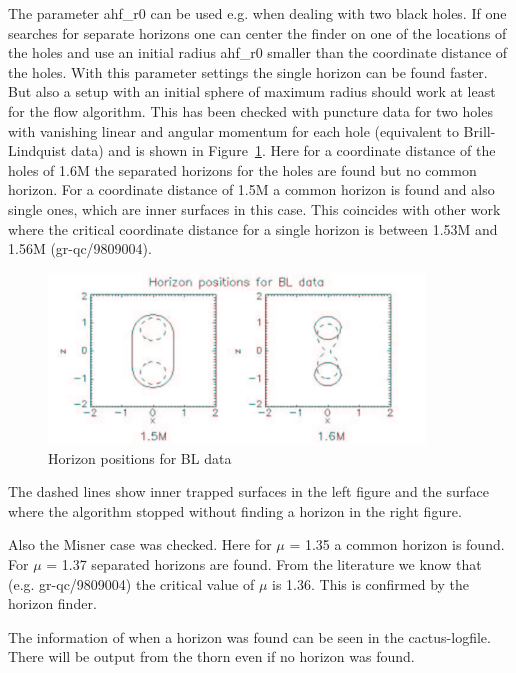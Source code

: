 The parameter ahf\_r0 can be used e.g. when dealing with two black holes.
If one searches for separate horizons one can center the finder on one of
the locations of the holes and use an initial radius ahf\_r0 smaller than
the coordinate distance of the holes. With this parameter settings the
single horizon can be found faster. But also a setup with an initial
sphere of maximum radius should work at least for the flow algorithm.
This has been checked with puncture data for two holes with vanishing
linear and angular momentum for each hole (equivalent to Brill-Lindquist
data) and is shown in Figure~\ref{CactusEinstein_AHFinder_p2_conv}. 
Here for a coordinate distance of the holes of 1.6M the separated
horizons for the holes are found but no common horizon. For a coordinate
distance of 1.5M a common horizon is found and also single ones, which
are inner surfaces in this case. This coincides with other work where the
critical coordinate distance for a single horizon is between 1.53M and
1.56M (gr-qc/9809004).

\begin{figure}[ht]
\begin{center}
\includegraphics[angle=0,width=10cm]{hori_bl}
\end{center}
\caption{Horizon positions for BL data}
\label{CactusEinstein_AHFinder_p2_conv}
\end{figure}

The dashed lines show inner trapped surfaces in the left figure and the
surface where the algorithm stopped without finding a horizon in the
right figure.

Also the Misner case was checked. Here for $\mu$ = 1.35 a common horizon is
found. For $\mu$ = 1.37 separated horizons are found. From the literature we
know that (e.g. gr-qc/9809004) the critical value of $\mu$ is 1.36. This is
confirmed by the horizon finder.

The information of when a horizon was found can be seen in the
cactus-logfile. There will be output from the thorn even if no horizon
was found.

\begin{thebibliography}{9}

\end{thebibliography}



